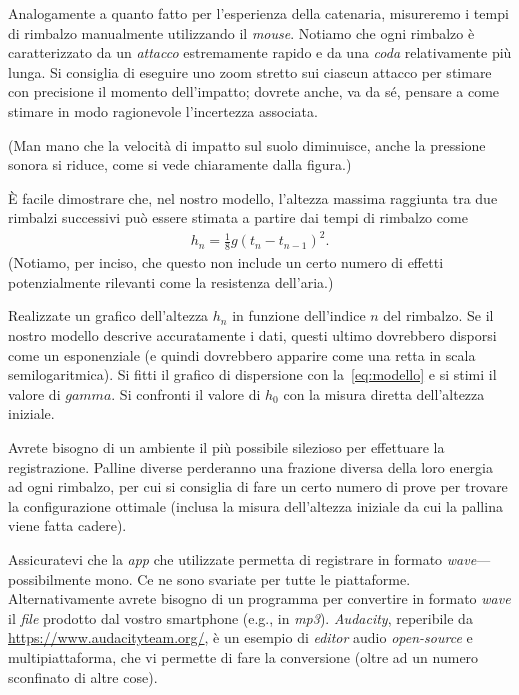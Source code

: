 \documentclass{lab1-article}
\begin{document}
\begin{article}

Analogamente a quanto fatto per l'esperienza della catenaria, misureremo
i tempi di rimbalzo manualmente utilizzando il \emph{mouse}. Notiamo che ogni
rimbalzo \`e caratterizzato da un \emph{attacco} estremamente rapido e da
una \emph{coda} relativamente pi\`u lunga. Si consiglia di eseguire uno
zoom stretto sui ciascun attacco per stimare con precisione il momento
dell'impatto; dovrete anche, va da s\'e, pensare a come stimare in modo
ragionevole l'incertezza associata.

(Man mano che la velocit\`a di impatto sul suolo diminuisce, anche la pressione
sonora si riduce, come si vede chiaramente dalla figura.)



\`E facile dimostrare che, nel nostro modello, l'altezza massima raggiunta tra
due rimbalzi successivi pu\`o essere stimata a partire dai tempi di rimbalzo
come
\begin{align}
  h_n = \frac{1}{8}g(t_n - t_{n-1})^2.
\end{align}
(Notiamo, per inciso, che questo non include un certo numero di effetti
potenzialmente rilevanti come la resistenza dell'aria.)

Realizzate un grafico dell'altezza $h_n$ in funzione dell'indice $n$ del rimbalzo.
Se il nostro modello descrive accuratamente i dati, questi ultimo dovrebbero
disporsi come un esponenziale (e quindi dovrebbero apparire come una retta
in scala semilogaritmica). Si fitti il grafico di dispersione con la~\eqref{eq:modello}
e si stimi il valore di $gamma$. Si confronti il valore di $h_0$ con la misura
diretta dell'altezza iniziale.


\secconsiderations

Avrete bisogno di un ambiente il pi\`u possibile silezioso per effettuare la
registrazione. Palline diverse perderanno una frazione diversa della loro energia
ad ogni rimbalzo, per cui si consiglia di fare un certo numero di prove per
trovare la configurazione ottimale (inclusa la misura dell'altezza iniziale da
cui la pallina viene fatta cadere).

Assicuratevi che la \emph{app} che utilizzate permetta di registrare in formato
\emph{wave}---possibilmente mono. Ce ne sono svariate per tutte le piattaforme.
Alternativamente avrete bisogno di un programma per convertire in formato
\emph{wave} il \emph{file} prodotto dal vostro smartphone (e.g., in \emph{mp3}).
\emph{Audacity}, reperibile da \url{https://www.audacityteam.org/}, \`e un
esempio di \emph{editor} audio \emph{open-source} e multipiattaforma, che
vi permette di fare la conversione (oltre ad un numero sconfinato di altre cose).


\onecolumn




\end{article}
\end{document}
